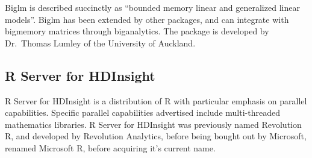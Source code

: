 \documentclass[10pt,a4paper]{article}
\begin{document}
Biglm is described succinctly as \enquote{bounded memory linear and
  generalized linear models}\cite{lumley13}. Biglm has been extended
by other packages, and can integrate with bigmemory matrices through
biganalytics. The package is developed by Dr.~Thomas Lumley of the
University of Auckland.

\subsection{R Server for HDInsight}
\label{sec:r-server-hdinsight}

R Server for HDInsight is a distribution of R with particular emphasis
on parallel capabilities\cite{azure16:_r_server_hdins_r_analy}.
Specific parallel capabilities advertised include multi-threaded
mathematics libraries. R Server for HDInsight was previously named
Revolution R, and developed by Revolution Analytics, before being
bought out by Microsoft, renamed Microsoft R, before acquiring it's
current name.

\printbibliography{}
\end{document}

